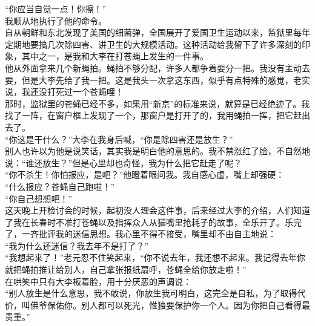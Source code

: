 “你应当自觉一点！你擦！”\\

我顺从地执行了他的命令。\\

自从朝鲜和东北发现了美国的细菌弹，全国展开了爱国卫生运动以来，监狱里每年定期地要搞几次除四害、讲卫生的大规模活动。这种活动给我留下了许多深刻的印象，其中之一，是我和大李在打苍蝇上发生的一件事。\\

他从外面拿来几个新蝇拍。蝇拍不够分配，许多人都争着要分一把。我没有主动去要，但是大李先给了我一把。这是我头一次拿这东西，似乎有点特殊的感觉，老实说，我还没打死过一个苍蝇哩！\\

那时，监狱里的苍蝇已经不多，如果用“新京”的标准来说，就算是已经绝迹了。我找了一阵，在窗户框上发现了一个，那窗户是打开了的，我用蝇拍一挥，把它赶出去了。\\

“你这是干什么？”大李在我身后喊，“你是除四害还是放生？”\\

别人也许以为他是说笑话，其实我是明白他的意思的。我不禁涨红了脸，不自然地说：“谁还放生？”但是心里却也奇怪，我为什么把它赶走了呢？\\

“你不杀生！你怕报应，是吧？”他瞪着眼问我。我自感心虚，嘴上却强硬：\\

“什么报应？苍蝇自己跑啦！”\\

“你自己想想吧！”\\

这天晚上开检讨会的时候，起初没人理会这件事，后来经过大李的介绍，人们知道了我在长春时不准打苍蝇以及指挥众人从猫嘴里抢耗子的故事，全乐开了。乐完了，一齐批评我的迷信思想。我心里不得不接受，嘴里却不由自主地说：\\

“我为什么还迷信？我去年不是打了？”\\

“我想起来了！”老元忍不住笑起来，“你不说去年，我还想不起来。我记得去年你就把蝇拍推让给别人，自己拿张报纸扇呼，苍蝇全给你放走啦！”\\

在哄笑中只有大李板着脸，用十分厌恶的声调说：\\

“别人放生是什么意思，我不敢说，你放生我可明白，这完全是自私，为了取得代价，叫佛爷保佑你。别人都可以死光，惟独要保护你一个人。因为你把自己看得最贵重。”\\

